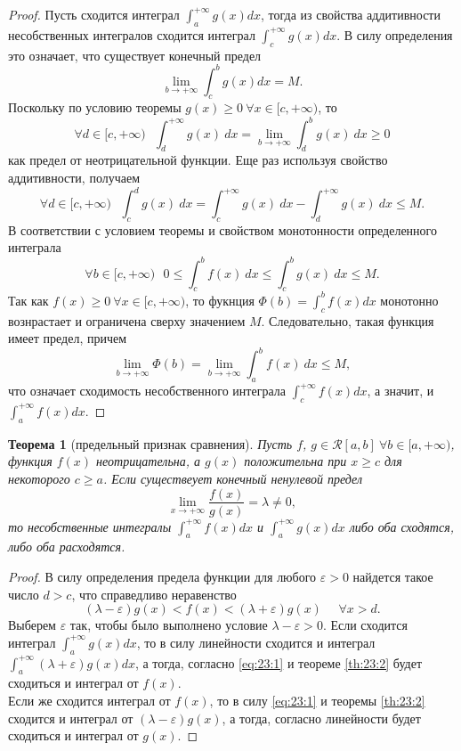 \documentclass[12pt]{report}
\numberwithin{equation}{section}
\newtheorem{theorem}{Теорема}[section]
\begin{document}
\begin{proof}
Пусть сходится интеграл $\int_a^{+\infty}g(x)dx$, тогда из свойства аддитивности несобственных интегралов сходится интеграл $\int_c^{+\infty}g(x)dx$. В силу определения это означает, что существует конечный предел
\[ \lim_{b \to +\infty}\int_c^b g(x)dx = M.\]
Поскольку по условию теоремы $g(x) \geqslant 0~\forall x \in [c, +\infty)$, то
\[ \forall d \in [c, +\infty)~~~ \int_d^{+\infty} g(x)~dx = \lim_{b \to +\infty} \int_d^b g(x)~dx \geqslant 0\]
как предел от неотрицательной функции. Еще раз используя свойство аддитивности, получаем
\[ \forall d \in [c, +\infty)~~~ \int_c^d g(x)~dx = \int_c^{+\infty} g(x)~dx - \int_d^{+\infty} g(x)~dx \leqslant M.\]
В соответствии с условием теоремы и свойством монотонности определенного интеграла
\[ \forall b \in [c, +\infty)~~~ 0 \leqslant \int_c^b f(x)~dx \leqslant \int_c^b g(x)~dx \leqslant M.\]
Так как $f(x) \geqslant 0~\forall x \in [c,+\infty)$, то фукнция $\Phi(b) = \int_c^b f(x)dx$ монотонно вознрастает и ограничена сверху значением $M$. Следовательно, такая функция имеет предел, причем
\[ \lim_{b \to +\infty} \Phi(b) = \lim_{b \to +\infty} \int_a^b f(x)~dx \leqslant M, \]
что означает сходимость несобственного интеграла $\int_c^{+\infty}f(x)dx$, а значит, и $\int_a^{+\infty}f(x)dx$.
\end{proof}

\begin{theorem} [предельный признак сравнения] \label{th:23:3}
Пусть $f$, $g \in \mathcal{R}[a,b]~\forall b \in [a, + \infty)$, функция $f(x)$ неотрицательна, а $g(x)$ положительна при $x \geqslant c$ для некоторого $c \geqslant a$. Если существеует конечный ненулевой предел
\[ \lim_{x \to + \infty} \frac{f(x)}{g(x)} = \lambda \neq 0,\]
то несобственные интегралы $\int_a^{+ \infty} f(x)dx$ и $\int_a^{+ \infty} g(x)dx$ либо оба сходятся, либо оба расходятся.
\end{theorem}
\begin{proof}
 В силу определения предела функции для любого $\varepsilon > 0$ найдется такое  число $d > c$, что справедливо неравенство
\begin{equation} \label {eq:23:1}
(\lambda - \varepsilon) g(x) < f(x) < (\lambda + \varepsilon) g(x)~~~~~~\forall x > d.
\end{equation}
Выберем $\varepsilon$ так, чтобы было выполнено условие $\lambda - \varepsilon > 0$. Если сходится интеграл $\int_a^{+\infty}g(x)dx$, то в силу линейности сходится и интеграл $\int_a^{+\infty}(\lambda + \varepsilon) g(x)dx$, а тогда, согласно \eqref{eq:23:1} и теореме \ref{th:23:2} будет сходиться и интеграл от $f(x)$.\\

Если же сходится интеграл от $f(x)$, то в силу \eqref{eq:23:1} и теоремы \ref{th:23:2} сходится и интеграл от $(\lambda - \varepsilon)g(x)$, а тогда, согласно линейности будет сходиться и интеграл от $g(x)$.
\end{proof}
\end{document}
